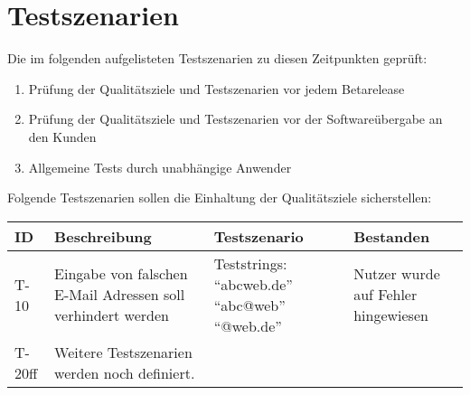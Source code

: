 
\chapter{Testszenarien}
Die im folgenden aufgelisteten Testszenarien zu diesen Zeitpunkten geprüft:
\begin{enumerate}
	\item Prüfung der Qualitätsziele und Testszenarien vor jedem Betarelease
	\item Prüfung der Qualitätsziele und Testszenarien vor der Softwareübergabe an den Kunden
	\item Allgemeine Tests durch unabhängige Anwender
\end{enumerate}



Folgende Testszenarien sollen die Einhaltung der Qualitätsziele sicherstellen:
\begin{tabularx}{\textwidth}{|l|X|X|X|}
\toprule
\textbf{ID} & \textbf{Beschreibung} & \textbf{Testszenario} & \textbf{Bestanden}\\
\endhead
\hline
T-10 & Eingabe von falschen E-Mail Adressen soll verhindert werden & Teststrings: \enquote{abcweb.de} \enquote{abc@web} \enquote{@web.de}& Nutzer wurde auf Fehler hingewiesen  \\
T-20ff & Weitere Testszenarien werden noch definiert. & & \\
\hline
\end{tabularx}

